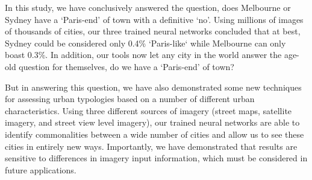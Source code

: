 \documentclass[sageh,times]{sagej}
\begin{document}
In this study, we have conclusively answered the question, does Melbourne or Sydney have a `Paris-end' of town with a definitive `no'. Using millions of images of thousands of cities, our three trained neural networks concluded that at best, Sydney could be considered only 0.4\% `Paris-like` while Melbourne can only boast 0.3\%. In addition, our tools now let any city in the world answer the age-old question for themselves, do we have a `Paris-end' of town?

But in answering this question, we have also demonstrated some new techniques for assessing urban typologies based on a number of different urban characteristics. Using three different sources of imagery (street maps, satellite imagery, and street view level imagery), our trained neural networks are able to identify commonalities between a wide number of cities and allow us to see these cities in entirely new ways. Importantly, we have demonstrated that results are sensitive to differences in imagery input information, which must be considered in future applications. 






  
  
\end{document}
